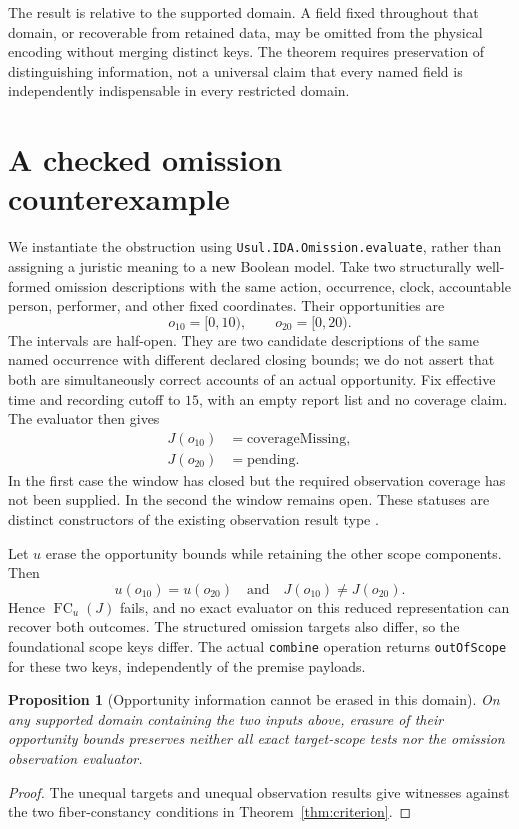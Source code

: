 \documentclass[11pt]{article}
\newtheorem{proposition}[theorem]{Proposition}
\newcommand{\FC}{\operatorname{FC}}
\begin{document}
The result is relative to the supported domain. A field fixed throughout that domain, or recoverable from retained data, may be omitted from the physical encoding without merging distinct keys. The theorem requires preservation of distinguishing information, not a universal claim that every named field is independently indispensable in every restricted domain.

\section{A checked omission counterexample}

We instantiate the obstruction using \texttt{Usul.\allowbreak{}IDA.\allowbreak{}Omission.\allowbreak{}evaluate}, rather than assigning a juristic meaning to a new Boolean model. Take two structurally well-formed omission descriptions with the same action, occurrence, clock, accountable person, performer, and other fixed coordinates. Their opportunities are
\[
 o_{10}=[0,10),\qquad o_{20}=[0,20).
\]
The intervals are half-open. They are two candidate descriptions of the same named occurrence with different declared closing bounds; we do not assert that both are simultaneously correct accounts of an actual opportunity. Fix effective time and recording cutoff to \(15\), with an empty report list and no coverage claim. The evaluator then gives
\[
\begin{aligned}
 J(o_{10})&=\mathrm{coverageMissing},\\
 J(o_{20})&=\mathrm{pending}.
\end{aligned}
\]
In the first case the window has closed but the required observation coverage has not been supplied. In the second the window remains open. These statuses are distinct constructors of the existing observation result type \cite{omission}.

Let \(u\) erase the opportunity bounds while retaining the other scope components. Then
\[
 u(o_{10})=u(o_{20})\quad\text{and}\quad J(o_{10})\ne J(o_{20}).
\]
Hence \(\FC_u(J)\) fails, and no exact evaluator on this reduced representation can recover both outcomes. The structured omission targets also differ, so the foundational scope keys differ. The actual \texttt{combine} operation returns \texttt{outOfScope} for these two keys, independently of the premise payloads.

\begin{proposition}[Opportunity information cannot be erased in this domain]
On any supported domain containing the two inputs above, erasure of their opportunity bounds preserves neither all exact target-scope tests nor the omission observation evaluator.
\end{proposition}
\begin{proof}
The unequal targets and unequal observation results give witnesses against the two fiber-constancy conditions in Theorem~\ref{thm:criterion}.
\end{proof}
\end{document}
